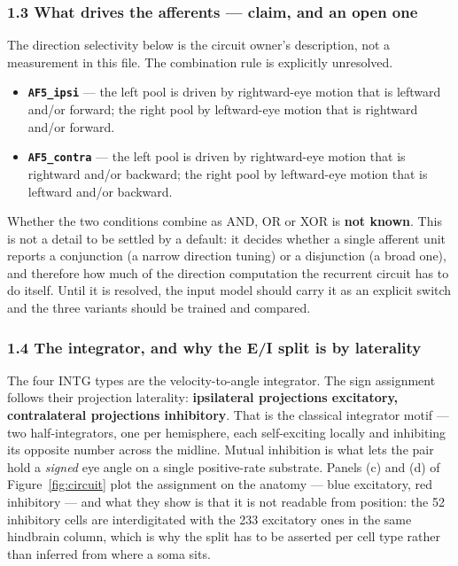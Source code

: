 \documentclass[10pt]{article}
\begin{document}
\subsubsection*{1.3 What drives the afferents --- claim, and an open one}

The direction selectivity below is the circuit owner's description, not a measurement in
this file. The combination rule is explicitly unresolved.

\begin{itemize}\setlength{\itemsep}{1pt}
\item \textbf{\texttt{AF5\_ipsi}} --- the left pool is driven by rightward-eye motion that
is leftward and/or forward; the right pool by leftward-eye motion that is rightward and/or
forward.
\item \textbf{\texttt{AF5\_contra}} --- the left pool is driven by rightward-eye motion that
is rightward and/or backward; the right pool by leftward-eye motion that is leftward and/or
backward.
\end{itemize}

Whether the two conditions combine as AND, OR or XOR is \textbf{not known}. This is not a
detail to be settled by a default: it decides whether a single afferent unit reports a
conjunction (a narrow direction tuning) or a disjunction (a broad one), and therefore how
much of the direction computation the recurrent circuit has to do itself. Until it is
resolved, the input model should carry it as an explicit switch and the three variants
should be trained and compared.

\subsubsection*{1.4 The integrator, and why the E/I split is by laterality}

The four INTG types are the velocity-to-angle integrator. The sign assignment follows their
projection laterality: \textbf{ipsilateral projections excitatory, contralateral projections
inhibitory}. That is the classical integrator motif --- two half-integrators, one per
hemisphere, each self-exciting locally and inhibiting its opposite number across the
midline. Mutual inhibition is what lets the pair hold a \emph{signed} eye angle on a single
positive-rate substrate. Panels (c) and (d) of Figure~\ref{fig:circuit} plot the assignment
on the anatomy --- blue excitatory, red inhibitory --- and what they show is that it is not
readable from position: the 52 inhibitory cells are interdigitated with the 233 excitatory
ones in the same hindbrain column, which is why the split has to be asserted per cell type
rather than inferred from where a soma sits.
\end{document}
